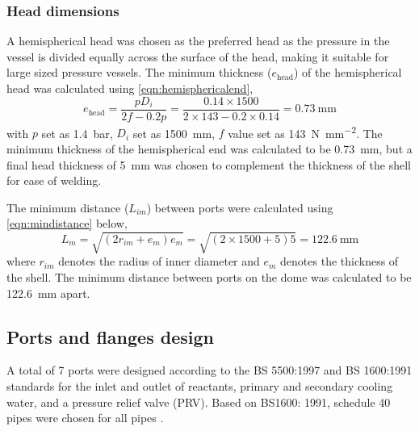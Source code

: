 \subsubsection{Head dimensions}
A hemispherical head was chosen as the preferred head as the pressure in the vessel is divided equally across the surface of the head, making it suitable for large sized pressure vessels. The minimum thickness ($e_\mathrm{head}$) of the hemispherical head was calculated using \cref{eqn:hemisphericalend},
\begin{equation}
    e_\mathrm{head} = \frac{pD_i}{2f-0.2p} = \frac{0.14 \times 1500}{2 \times 143 - 0.2 \times 0.14} = \SI{0.73}{\mm}
    \label{eqn:hemisphericalend}
\end{equation}
with $p$ set as \SI{1.4}{\bar}, $D_i$ set as \SI{1500}{\milli \metre}, $f$ value set as \SI{143}{\N\per\square\mm}.  The minimum thickness of the hemispherical end was calculated to be \SI{0.73}{\milli \metre}, but a final head thickness of \SI{5}{\milli \metre} was chosen to complement the thickness of the shell for ease of welding. 

The minimum distance ($L_{im}$) between ports were calculated using \cref{eqn:mindistance} below,
\begin{equation}
    L_m = \sqrt{(2r_{im}+e_{m})e_m} = \sqrt{(2 \times 1500 + 5)5} = \SI{122.6}{\mm}
    \label{eqn:mindistance}
\end{equation}
where $r_{im}$ denotes the radius of inner diameter and $e_m$ denotes the thickness of the shell. The minimum distance between ports on the dome was calculated to be \SI{122.6}{\milli \metre} apart. 

\subsection{Ports and flanges design}
A total of 7 ports were designed according to the BS 5500:1997 and BS 1600:1991 standards for the inlet and outlet of reactants, primary and secondary cooling water, and a pressure relief valve (PRV). Based on BS1600: 1991, schedule 40 pipes were chosen for all pipes \cite{noauthor_dimensions_nodate}. 

